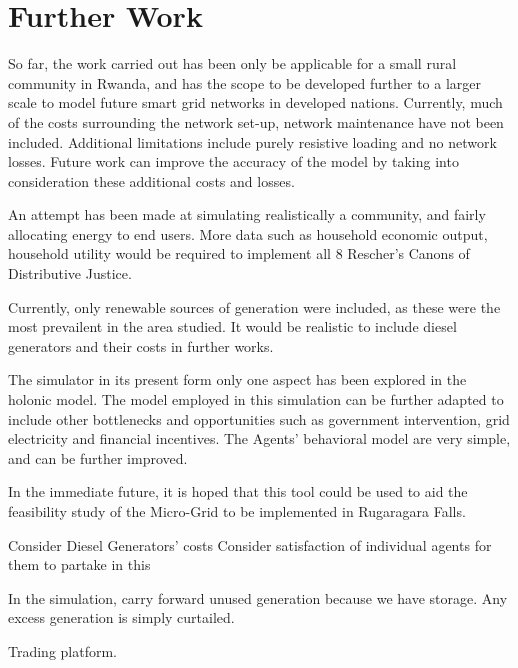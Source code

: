 \chapter{Further Work}
\label{Further Work}

So far, the work carried out has been only be applicable for a small rural community in Rwanda, and has the scope to be developed further to a larger scale to model future smart grid networks in developed nations. Currently, much of the costs surrounding the network set-up, network maintenance have not been included. Additional limitations include purely resistive loading and no network losses. Future work can improve the accuracy of the model by taking into consideration these additional costs and losses.

An attempt has been made at simulating realistically a community, and fairly allocating energy to end users. More data such as household economic output, household utility would be required to implement all 8 Rescher's Canons of Distributive Justice. 

Currently, only renewable sources of generation were included, as these were the most prevailent in the area studied. It would be realistic to include diesel generators and their costs in further works.

The simulator in its present form only one aspect has been explored in the holonic model. The model employed in this simulation can be further adapted to include other bottlenecks and opportunities such as government intervention, grid electricity and financial incentives. The Agents' behavioral model are very simple, and can be further improved.

In the immediate future, it is hoped that this tool could be used to aid the feasibility study of the Micro-Grid to be implemented in Rugaragara Falls. 

Consider Diesel Generators' costs 
Consider satisfaction of individual agents for them to partake in this

In the simulation, carry forward unused generation because we have storage. Any excess generation is simply curtailed.

Trading platform.